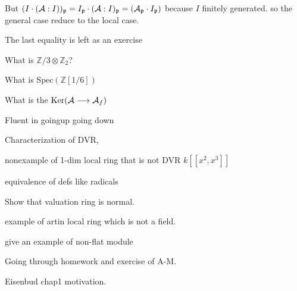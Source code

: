 \documentclass[11pt]{article}
\newcommand{\intg}{\mathbb Z}
\newcommand{\scp}{{\mathfrak p}}
\newcommand{\cala}{{\cal A}}
\newcommand{\lrta}{\longrightarrow}
\begin{document}
But $(I\cdot (\cala:I))_\scp=I_\scp\cdot (\cala: I)_\scp=(\cala_\scp\cdot I_\scp)$ because $I$ finitely generated. so the general case reduce to the local case.

The last equality is left as an exercise


What is $\intg/3\otimes \intg_2$?

What is $\text{Spec}(\intg[1/6])$

What is the $\text{Ker}(\cala\lrta \cala_f)$

Fluent in goingup going down

Characterization of DVR,

nonexample of 1-dim local ring that is not DVR $k[[x^2,x^3]]$

equivalence of defs like radicals

Show that valuation ring is normal.

example of artin local ring which is not a field.

give an example of non-flat module

Going through homework and exercise of A-M.

Eisenbud chap1 motivation.
\end{document}
